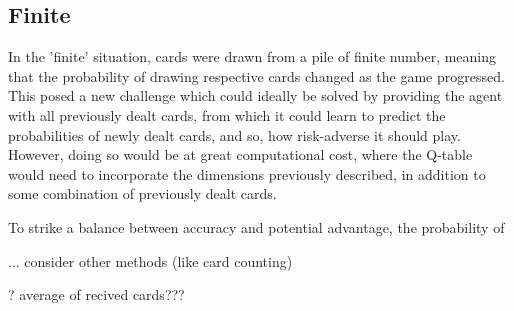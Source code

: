 \subsection{Finite}

In the 'finite' situation, cards were drawn from a pile of finite number, meaning that the probability of drawing respective cards changed as the game progressed. This posed a new challenge which could ideally be solved by providing the agent with all previously dealt cards, from which it could learn to predict the probabilities of newly dealt cards, and so, how risk-adverse it should play. However, doing so would be at great computational cost, where the Q-table would need to incorporate the dimensions previously described, in addition to some combination of previously dealt cards. 

To strike a balance between accuracy and potential advantage, the probability of 

... consider other methods (like card counting)

? average of recived cards???
